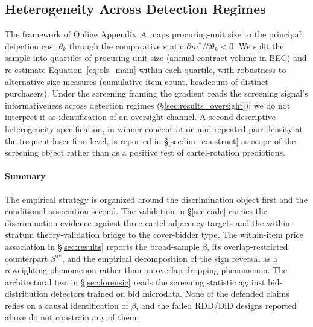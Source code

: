 \subsection{Heterogeneity Across Detection Regimes}
\label{sec:emp_heterogeneity}

The framework of Online Appendix~A maps procuring-unit size to
the principal detection cost $\theta_k$ through the comparative
static $\partial m^{*}/\partial\theta_k<0$. We split the sample
into quartiles of procuring-unit size (annual contract volume
in BEC) and re-estimate Equation~\eqref{eq:ols_main} within
each quartile, with robustness to alternative size measures
(cumulative item count, headcount of distinct purchasers).
Under the screening framing the gradient reads the screening
signal's informativeness across detection regimes
(§\ref{sec:results_oversight}); we do not interpret it as
identification of an oversight channel. A second descriptive
heterogeneity specification, in winner-concentration and
repeated-pair density at the frequent-loser-firm level, is
reported in §\ref{sec:lim_construct} as scope of the screening
object rather than as a positive test of cartel-rotation
predictions.

\paragraph*{Summary}
The empirical strategy is organized around the discrimination
object first and the conditional association second. The
validation in \S\ref{sec:cade} carries the discrimination
evidence against three cartel-adjacency targets and the within-
stratum theory-validation bridge to the cover-bidder type. The
within-item price association in \S\ref{sec:results} reports
the broad-sample $\beta$, its overlap-restricted counterpart
$\beta^{\text{ov}}$, and the empirical decomposition of the
sign reversal as a reweighting phenomenon rather than an
overlap-dropping phenomenon. The architectural test in
\S\ref{sec:forensic} reads the screening statistic against bid-
distribution detectors trained on bid microdata. None of the
defended claims relies on a causal identification of $\beta$,
and the failed RDD/DiD designs reported above do not constrain
any of them.

